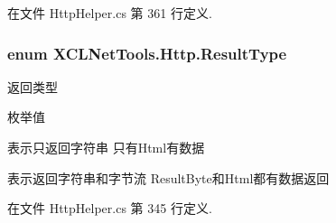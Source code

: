 在文件 Http\+Helper.\+cs 第 361 行定义.

\subsubsection[{\texorpdfstring{Result\+Type}{ResultType}}]{\setlength{\rightskip}{0pt plus 5cm}enum {\bf X\+C\+L\+Net\+Tools.\+Http.\+Result\+Type}\hspace{0.3cm}{\ttfamily [strong]}}\hypertarget{namespace_x_c_l_net_tools_1_1_http_a3216524397972f7d0c5733b123216e9e}{}\label{namespace_x_c_l_net_tools_1_1_http_a3216524397972f7d0c5733b123216e9e}


返回类型 

\begin{Desc}
\item[枚举值]\par
\begin{description}
\item[{\em 
String\hypertarget{namespace_x_c_l_net_tools_1_1_http_a3216524397972f7d0c5733b123216e9ea27118326006d3829667a400ad23d5d98}{}\label{namespace_x_c_l_net_tools_1_1_http_a3216524397972f7d0c5733b123216e9ea27118326006d3829667a400ad23d5d98}
}]表示只返回字符串 只有\+Html有数据 \item[{\em 
Byte\hypertarget{namespace_x_c_l_net_tools_1_1_http_a3216524397972f7d0c5733b123216e9eaa245c3230debe5c956484ecc6fa93877}{}\label{namespace_x_c_l_net_tools_1_1_http_a3216524397972f7d0c5733b123216e9eaa245c3230debe5c956484ecc6fa93877}
}]表示返回字符串和字节流 Result\+Byte和\+Html都有数据返回 \end{description}
\end{Desc}


在文件 Http\+Helper.\+cs 第 345 行定义.

